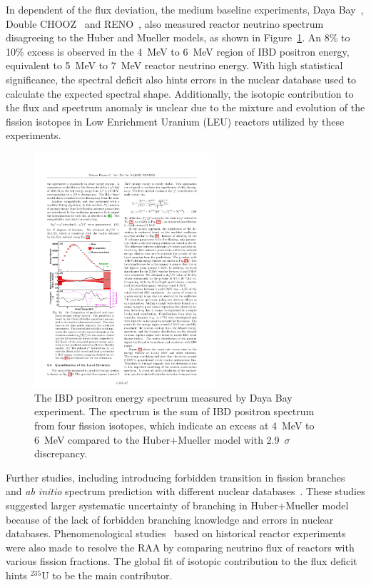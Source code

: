     In dependent of the flux deviation, the medium baseline experiments, Daya Bay~\cite{bib:DYBSpectrum}, Double CHOOZ~\cite{bib:DBChooz} and RENO~\cite{bib:RENO}, also measured reactor neutrino spectrum disagreeing to the Huber and Mueller models, as shown in Figure~\ref{fig:DYBSpectrum}.
    An 8\% to 10\% excess is observed in the 4~MeV to 6~MeV region of IBD positron energy, equivalent to 5~MeV to 7~MeV reactor neutrino energy.
    With high statistical significance, the spectral deficit also hints errors in the nuclear database used to calculate the expected spectral shape.
    Additionally, the isotopic contribution to the flux and spectrum anomaly is unclear due to the mixture and evolution of the fission isotopes in Low Enrichment Uranium (LEU) reactors utilized by these experiments.
 \begin{figure}[h!]
    \centering
    \includegraphics[width=0.6\textwidth]{Figures/DYBSpectrum.pdf}
    \caption[Daya Bay IBD positron energy spectrum]{The IBD positron energy spectrum measured by Daya Bay experiment.
    The spectrum is the sum of IBD positron spectrum from four fission isotopes, which indicate an excess at 4~MeV to 6~MeV compared to the Huber+Mueller model with 2.9~$\sigma$ discrepancy.}
    \label{fig:DYBSpectrum}
    
\end{figure} 
    

    Further studies, including introducing forbidden transition in fission branches~\cite{bib:hayes} and \textit{ab initio} spectrum prediction with different nuclear databases~\cite{bib:dwyer}.
    These studies suggested larger systematic uncertainty of branching in Huber+Mueller model because of the lack of forbidden branching knowledge and errors in nuclear databases.
    Phenomenological studies~\cite{bib:giunti2019} based on historical reactor experiments were also made to resolve the RAA by comparing neutrino flux of reactors with various fission fractions.
    The global fit of isotopic contribution to the flux deficit hints $^{235}$U to be the main contributor. 
    
